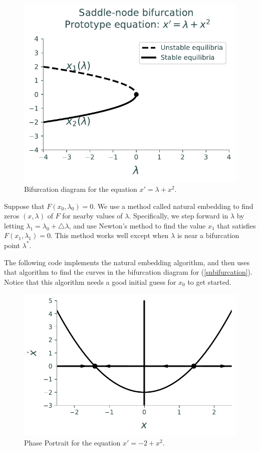 \newpage
\begin{figure}
\centering
\includegraphics[width=\textwidth]{figures/SaddleNBifurcation.pdf}
\caption{Bifurcation diagram for the equation $x' = \lambda + x^2$.}
\label{bifurcation:sn}
\end{figure}

Suppose that $F(x_0,\lambda_0) = 0.$
We use a method called natural embedding to find zeros $(x,\lambda)$ of $F$ for nearby values of $\lambda$.
Specifically, we step forward in $\lambda$ by letting $\lambda_1 = \lambda_0 + \triangle \lambda$, and use Newton's method to find the value $x_1$ that satisfies $F(x_1,\lambda_1) = 0.$
This method works well except when $\lambda$ is near a bifurcation point $\lambda^*$.

The following code implements the natural embedding algorithm, and then uses that algorithm to find the curves in the bifurcation diagram for (\ref{snbifurcation}).
Notice that this algorithm needs a good initial guess for $x_0$ to get started.

\begin{figure}
\centering
\includegraphics[width=\textwidth]{figures/SaddleNPhasePortrait.pdf}
\caption{Phase Portrait for the equation $x' = -2 + x^2$.}
\label{phaseportrait:sn}
\end{figure}

